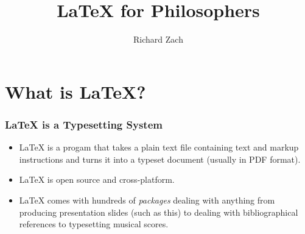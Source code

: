
\newenvironment{articleonly}{\mode<article>}{\mode<all>}


\title{\LaTeX{} for Philosophers}

\author{Richard Zach}



\frame{\maketitle}


\section{What is \LaTeX?}

\begin{frame}
  \frametitle{\LaTeX{} is a Typesetting System}

\begin{itemize}
\item \LaTeX{} is a progam that takes a plain text file containing
  text and markup instructions and turns it into a typeset document
  (usually in PDF format).
\item \LaTeX{} is open source and cross-platform.
\item \LaTeX{} comes with hundreds of \emph{packages} dealing with
  anything from producing presentation slides (such as this) to
  dealing with bibliographical references to typesetting musical
  scores.
\end{itemize}
\end{frame}

